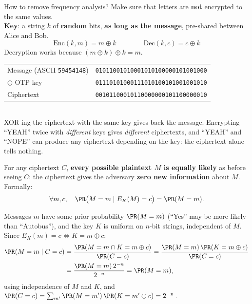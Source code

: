 \begin{defnbox}[title=One-Time Pad (OTP)]
How to remove frequency analysis? Make sure that letters are \textbf{not} encrypted to
the same values. \\
\textbf{Key}: a string $k$ of \textbf{random} bits, \textbf{as long as the message},
pre-shared between Alice and Bob.
\[
  \mathrm{Enc}(k, m) = m \oplus k \qquad\qquad \mathrm{Dec}(k, c) = c \oplus k
\]
Decryption works because $(m \oplus k) \oplus k = m$.
\end{defnbox}

\begin{exbox}[title=OTP on ``YEAH'']
\begin{tabular}{ll}
Message (ASCII \texttt{59454148}) & \texttt{01011001010001010100000101001000} \\
$\oplus$ OTP key                   & \texttt{01110101000111010100101001001010} \\ \hline
Ciphertext                         & \texttt{00101100010110000000101100000010}
\end{tabular} \\[4pt]
XOR-ing the ciphertext with the same key gives back the message. Encrypting ``YEAH''
twice with \emph{different} keys gives \emph{different} ciphertexts, and ``YEAH'' and
``NOPE'' can produce any ciphertext depending on the key: the ciphertext alone tells
nothing.
\end{exbox}

\begin{defnbox}[title=Perfect secrecy]
For any ciphertext $C$, \textbf{every possible plaintext $M$ is equally likely} as
before seeing $C$: the ciphertext gives the adversary \textbf{zero new information} about
$M$. Formally:
\[
  \forall m, c,\quad \PR\big(M = m \mid E_K(M) = c\big) = \PR(M = m).
\]
\end{defnbox}

\begin{proofbox}[title=The OTP is perfectly secure]
Messages $m$ have some prior probability $\PR(M = m)$ (``Yes'' may be more likely than
``Autobus''), and the key $K$ is uniform on $n$-bit strings, independent of $M$. Since
$E_K(m) = c \iff K = m \oplus c$:
\begin{align*}
  \PR(M = m \mid C = c)
  &= \frac{\PR(M = m \cap K = m \oplus c)}{\PR(C = c)}
   = \frac{\PR(M = m)\,\PR(K = m \oplus c)}{\PR(C = c)} \\
  &= \frac{\PR(M = m)\, 2^{-n}}{2^{-n}}
   = \PR(M = m),
\end{align*}
using independence of $M$ and $K$, and
$\PR(C = c) = \sum_{m'} \PR(M = m')\,\PR(K = m' \oplus c) = 2^{-n}$.
\end{proofbox}

